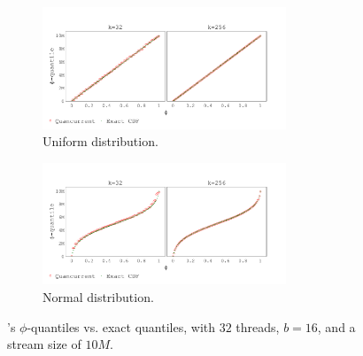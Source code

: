 \begin{figure}[h!]
\centering
    \begin{subfigure}[]{\textwidth}
        \centering
        \includegraphics[width=0.8\textwidth,trim={0.1cm 0.2cm 1.5cm 1cm},clip]
        {graphics/graphs/accuracy/Oracle_Quancurrent_blocking_numa_cdf_uniform_ks_32_256_b16_keys10M_runs1_uT_32_qT1_snapshot1_17-09-2022_06-51-43.pdf}
        \caption{Uniform distribution.} \label{fig:cdf_uniform}
    \end{subfigure}
    
    \begin{subfigure}[]{\textwidth}
        \centering
        \includegraphics[width=0.8\textwidth,trim={0.1cm 0.2cm 1.5cm 1cm},clip]
        {graphics/graphs/accuracy/Oracle_Quancurrent_blocking_numa_cdf_normal_ks_32_256_b16_keys10M_runs1_uT_32_qT1_snapshot1_17-09-2022_06-51-43.pdf}
        \caption{Normal distribution.} \label{fig:cdf_normal}
    \end{subfigure}

\caption{\mysketch's $\phi$-quantiles vs. exact quantiles, with $32$ threads, $b=16$, and a stream size of $10M$.} \label{fig:cdf}
\end{figure}

